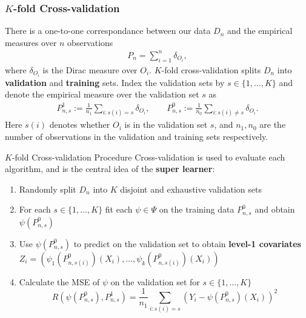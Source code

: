 \documentclass{beamer}
\newcommand{\ml}{k}
\newcommand{\la}{\psi}
\newcommand{\lib}{\Psi}
\begin{document}
\begin{frame}
\frametitle{$ K $-fold Cross-validation}
There is a one-to-one correspondance between our data $ D_n $ and the empirical measures over $ n $ observations
\begin{align*}
    P_n = \sum_{i = 1}^{n} \delta_{O_i},
\end{align*}
where $ \delta_{O_i} $ is the Dirac measure over $ O_i $. $ K $-fold cross-validation splits $ D_n $ into \textbf{validation} and \textbf{training} sets. Index the validation sets by $ s \in \{1, \dots , K\} $ and denote the empirical measure over the validation set $ s $ as 
\begin{align*}
    P_{n,s}^{1} := \frac{1}{n_1} \sum_{i: s(i) = s} \delta_{O_i}, \qquad P_{n,s}^{0} := \frac{1}{n_0} \sum_{i: s(i) \neq s} \delta_{O_i}. 
\end{align*}
Here $ s(i) $ denotes whether $ O_i$ is in the validation set $ s $, and $ n_1, n_0 $ are the number of observations in the validation and training sets respectively. 
\end{frame}

\begin{frame}
\begin{exampleblock}{$ K $-fold Cross-validation Procedure}
Cross-validation is used to evaluate each algorithm, and is the central idea of the \textbf{super learner}:
    \begin{enumerate}
        \item Randomly split $ D_n $ into $ K $ disjoint and exhaustive validation sets
        \item For each $ s \in \{1, \dots , K\} $ fit each $ \la \in \lib $ on the training data $ P_{n, s}^{0} $ and obtain $ \la(P_{n, s}^{0}) $ 
        \item Use $ \la(P_{n, s}^{0}) $ to predict on the validation set to obtain \textbf{level-1 covariates} $ Z_i = \left(\la_1(P_{n, s(i)}^{0})(X_i), \dots ,\la_\ml(P_{n, s(i)}^{0})(X_i)\right)  $
        \item Calculate the MSE of $ \la $ on the validation set for $ s \in \{1, \dots, K \}$ 
            $$ R(\la(P_{n, s}^{0}) , P_{n, s}^{1}) = \frac{1}{n_1} \sum_{i : s(i) = s} \left(Y_i - \la(P_{n, s}^{0})(X_i)\right)^2 $$ 
    \end{enumerate}
\end{exampleblock}
\end{frame}
\end{document}
